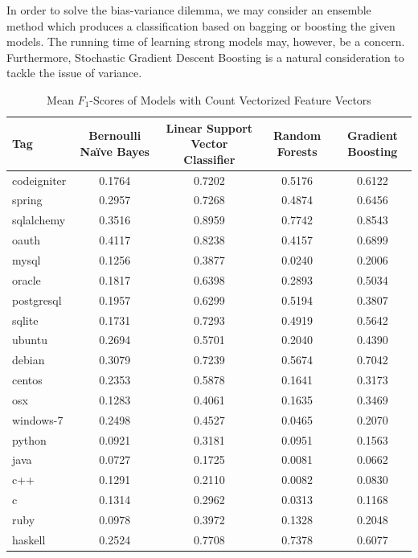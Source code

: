 \documentclass{sig-alternate}
\begin{document}
	In order to solve the bias-variance dilemma, we may consider an ensemble
	method which produces a classification based on bagging or boosting the
	given models. The running time of learning strong models may, however, be a
	concern. Furthermore, Stochastic Gradient Descent Boosting is a natural
	consideration to tackle the issue of variance.




\begin{table}[ht!]
	\centering
	\begin{tabular}{|l|c|c|c|c|}
		\hline
		\textbf{Tag} & \textbf{Bernoulli Na\"{i}ve Bayes} & \textbf{Linear Support Vector Classifier} & \textbf{Random Forests} & \textbf{Gradient Boosting} \\\hline
		codeigniter	& 0.1764	& 0.7202	& 0.5176	& 0.6122 \\\hline
		spring		& 0.2957	& 0.7268	& 0.4874	& 0.6456 \\\hline
		sqlalchemy	& 0.3516	& 0.8959	& 0.7742	& 0.8543 \\\hline
		oauth		& 0.4117	& 0.8238	& 0.4157	& 0.6899 \\\hline
		mysql		& 0.1256	& 0.3877	& 0.0240	& 0.2006 \\\hline
		oracle		& 0.1817	& 0.6398	& 0.2893	& 0.5034 \\\hline
		postgresql	& 0.1957	& 0.6299	& 0.5194	& 0.3807 \\\hline
		sqlite		& 0.1731	& 0.7293	& 0.4919	& 0.5642 \\\hline
		ubuntu		& 0.2694	& 0.5701	& 0.2040	& 0.4390 \\\hline
		debian		& 0.3079	& 0.7239	& 0.5674	& 0.7042 \\\hline
		centos		& 0.2353	& 0.5878	& 0.1641	& 0.3173 \\\hline
		osx			& 0.1283	& 0.4061	& 0.1635	& 0.3469 \\\hline
		windows-7	& 0.2498	& 0.4527	& 0.0465	& 0.2070 \\\hline
		python		& 0.0921	& 0.3181	& 0.0951	& 0.1563 \\\hline
		java		& 0.0727	& 0.1725	& 0.0081	& 0.0662 \\\hline
		c++			& 0.1291	& 0.2110	& 0.0082	& 0.0830 \\\hline
		c			& 0.1314	& 0.2962	& 0.0313	& 0.1168 \\\hline
		ruby		& 0.0978	& 0.3972	& 0.1328	& 0.2048 \\\hline
		haskell		& 0.2524	& 0.7708	& 0.7378	& 0.6077 \\\hline
	\end{tabular}
	\caption{Mean $F_1$-Scores of Models with Count Vectorized Feature Vectors}
	\label{tab:count_model_scores}
\end{table}
\end{document}
